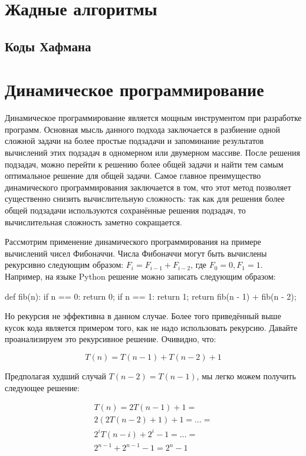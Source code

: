 \section{Жадные алгоритмы}

\subsection{Коды Хафмана}

\section{Динамическое программирование}

Динамическое программирование является мощным инструментом 
при разработке программ. Основная мысль данного подхода заключается 
в разбиение одной сложной задачи на более простые подзадачи и запоминание 
результатов вычислений этих подзадач в одномерном или двумерном массиве. 
После решения подзадач, можно перейти к решению более общей задачи и найти тем 
самым оптимальное решение для общей задачи. Самое главное преимущество динамического
программирования заключается в том, что этот метод позволяет существенно снизить 
вычислительную сложность: так как для решения более общей подзадачи используются
сохранённые решения подзадач, то вычислительная сложность заметно сокращается. 

Рассмотрим применение динамического программирования на примере вычислений чисел Фибоначчи. Числа 
Фибоначчи могут быть вычислены рекурсивно следующим образом: $F_i = F_{i-1} + F_{i-2}$, 
где $F_0=0, F_1=1$. Например, на языке Python решение можно записать следующим образом:

\begin{python}
def fib(n):
	if n == 0:
		return 0;
	if n == 1:
		return 1;
	return fib(n - 1) + fib(n - 2);
\end{python}

Но рекурсия не эффективна в данном случае. Более того приведённый выше кусок кода 
является примером того, как не надо использовать рекурсию. Давайте проанализируем это 
рекурсивное решение. Очивидно, что:

$$
T(n) = T(n-1) + T(n-2) + 1
$$

Предполагая худший случай $T(n-2)=T(n-1)$, мы легко можем получить следующее решение:

\begin{equation*}
\begin{multlined}
T(n) = 2T(n-1) + 1= \\
	   2(2T(n-2) + 1) + 1 = 
	   \ldots = \\
	   2^{i}T(n-i) + 2^{i} - 1 = 
	   \ldots = \\
	   2^{n-1} + 2^{n-1} - 1 = 
	   2^{n} - 1
\end{multlined}
\end{equation*}

